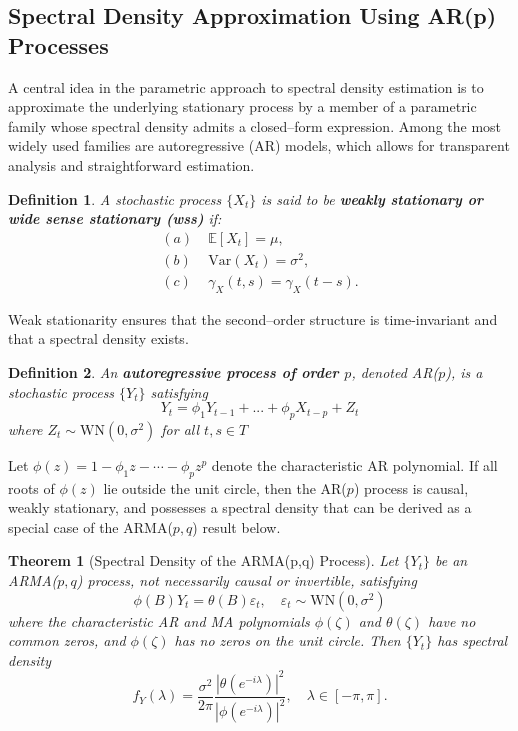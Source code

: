 \documentclass[preprint]{aastex}
\theoremstyle{nonitalicname}
\newtheorem{theorem}{Theorem}[section]
\theoremstyle{plain}
\newtheorem{definition}{Definition}[section]
\theoremstyle{remark}
\begin{document}
\subsection{Spectral Density Approximation Using AR(p) Processes}

A central idea in the parametric approach to spectral density estimation is to approximate the underlying stationary process by a member of a parametric family whose spectral density admits a closed--form expression. Among the most widely used families are autoregressive (AR) models, which allows for transparent analysis and straightforward estimation.
 

\begin{definition}
A stochastic process $\{X_t\}$ is said to be \textbf{weakly stationary or wide sense stationary (wss)} if:
$$\begin{aligned}
(a)\;& \mathbb{E}[X_t] = \mu,\\
(b)\;& \mathrm{Var}(X_t) = \sigma^2,\\
(c)\;& \gamma_X(t,s) = \gamma_X(t-s).
\end{aligned}$$
\end{definition}

Weak stationarity ensures that the second--order structure is time-invariant and that a spectral density exists.

\begin{definition}
An \textbf{autoregressive process of order $p$}, denoted AR($p$), is a stochastic process $\{Y_t\}$ satisfying
$$Y_t = \phi_1Y_{t-1}+ ... + \phi_p X_{t-p} + Z_t $$ 
where $Z_t \sim \text{WN}(0, \sigma^2)$ for all $t,s \in T$
\end{definition}
Let $\phi(z) = 1 - \phi_1 z - \cdots - \phi_p z^p$ denote the characteristic AR polynomial.  
If all roots of $\phi(z)$ lie outside the unit circle, then the AR($p$) process is causal, weakly stationary, and possesses a spectral density that can be derived as a special case of the ARMA($p,q$) result below.

\begin{theorem}[Spectral Density of the ARMA(p,q) Process]\label{thm:spectralarma}
Let $\{Y_t\}$ be an ARMA($p,q$) process, not necessarily causal or invertible, satisfying 
\begin{equation}
    \phi(B)Y_t = \theta(B)\varepsilon_t, \quad \varepsilon_t \sim \text{WN}(0, \sigma^2)
\end{equation}
where the characteristic AR and MA polynomials $\phi(\zeta)$ and $\theta(\zeta)$ 
have no common zeros, and $\phi(\zeta)$ has no zeros on the unit circle.  
Then $\{Y_t\}$ has spectral density
\begin{equation}
    f_Y(\lambda) = \frac{\sigma^2}{2\pi}
\frac{|\theta(e^{-i\lambda})|^2}{|\phi(e^{-i\lambda})|^2}, 
\quad \lambda \in [-\pi, \pi].
\end{equation}
\end{theorem}
\end{document}
